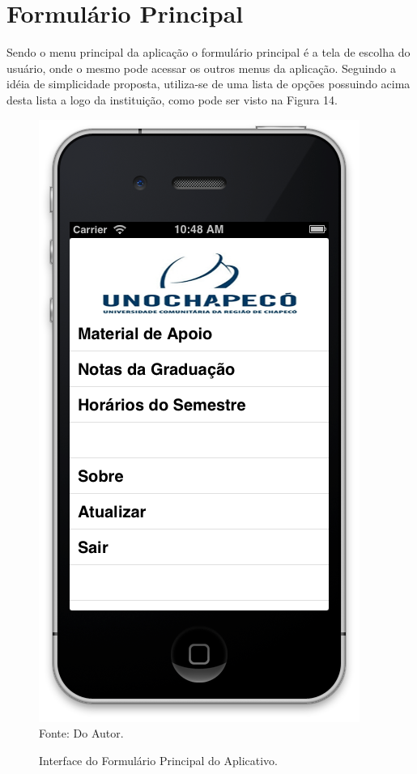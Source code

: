 \section{Formulário Principal}
Sendo o menu principal da aplicação o formulário principal é a tela de escolha do usuário, onde o mesmo pode acessar os outros menus da aplicação. Seguindo a idéia de simplicidade proposta, utiliza-se de uma lista de opções possuindo acima desta lista a logo da instituição, como pode ser visto na Figura 14.

\begin{figure}[!htb]
     \centering
     \caption[Formulário Principal - Interface]{Interface do Formulário Principal do Aplicativo.}
     \includegraphics[scale=0.5]{imagens/formprincipal.png}
     \\  Fonte: Do Autor.
\end{figure}


